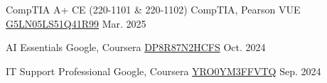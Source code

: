 
\begin{cvhonors}

	\cvhonor
	{CompTIA A+ CE (220-1101 \& 220-1102)} 
	{CompTIA, Pearson VUE} 
	{\href{https://www.certmetrics.com/comptia/public/verification.aspx}{G5LN05LS51Q41R99}}
	{Mar. 2025}


	\cvhonor
	{AI Essentials} %
	{Google, Coursera} %
	{\href{https://www.coursera.org/account/accomplishments/verify/DP8R87N2HCFS}{DP8R87N2HCFS}} %
	{Oct. 2024} %

	\cvhonor
	{IT Support Professional} %
	{Google, Coursera} %
	{\href{https://www.coursera.org/account/accomplishments/professional-cert/YRO0YM3FFVTQ}{YRO0YM3FFVTQ}} %
	{Sep. 2024} %


\end{cvhonors}
